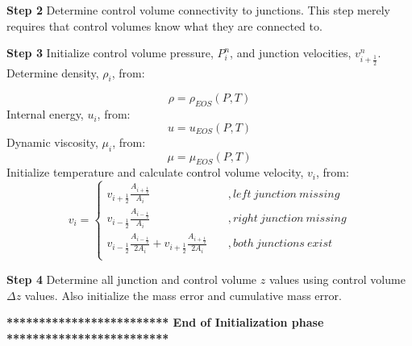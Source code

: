 \documentclass[11pt,letterpaper,titlepage]{article}
\newcommand{\half}{\frac{1}{2}}
\begin{document}
\vspace{0.5cm}\noindent
\textbf{Step 2}\newline
Determine control volume connectivity to junctions. This step merely requires that control volumes know what they are connected to.



\vspace{0.5cm}\noindent
\textbf{Step 3}\newline
\noindent Initialize control volume pressure, $P_i^n$, and junction velocities, $v_{i+\half}^n$.
\newline
\newline
Determine density, $\rho_i$, from:

\begin{equation*}
\rho=\rho_{EOS}(P,T)
\end{equation*}
\newline
Internal energy, $u_i$, from:
\begin{equation*}
u=u_{EOS}(P,T) 
\end{equation*}
\newline
Dynamic viscosity, $\mu_i$, from:
\begin{equation*}
\mu=\mu_{EOS}(P,T)
\end{equation*}
\newline
Initialize temperature and calculate control volume velocity, $v_i$, from:
\begin{equation*}
v_i=
\begin{cases}
v_{i+\half} \frac{A_{i+\half}}{A_i} \quad &, left \ junction  \ missing \\
v_{i-\half} \frac{A_{i-\half}}{A_i} \quad &, right \ junction  \ missing \\
v_{i-\half} \frac{A_{i-\half}}{2A_i} + v_{i+\half} \frac{A_{i+\half}}{2A_i} \quad &, both \ junctions  \ exist \\
\end{cases}
\end{equation*}


\vspace{0.5cm}\noindent
\textbf{Step 4}\newline
Determine all junction and control volume $z$ values using control volume $\Delta z$ values. Also initialize the mass error and cumulative mass error.

\vspace{0.5cm}\noindent
\textbf{************************* End of Initialization phase *************************}\newline
\end{document}
